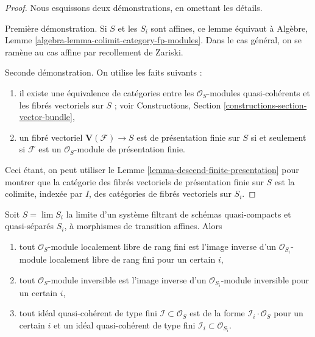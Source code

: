 \begin{proof}
Nous esquissons deux démonstrations, en omettant les détails.

\medskip\noindent
Première démonstration. Si $S$ et les $S_i$ sont affines, ce lemme
équivaut à
Algèbre, Lemme \ref{algebra-lemma-colimit-category-fp-modules}.
Dans le cas général, on se ramène au cas affine par recollement de Zariski.

\medskip\noindent
Seconde démonstration. On utilise les faits suivants :
\begin{enumerate}
\item il existe une équivalence de catégories entre les
$\mathcal{O}_S$-modules quasi-cohérents et les fibrés vectoriels sur $S$ ; voir
Constructions, Section \ref{constructions-section-vector-bundle},
\item un fibré vectoriel $\mathbf{V}(\mathcal{F}) \to S$ est
de présentation finie sur $S$ si et seulement si $\mathcal{F}$
est un $\mathcal{O}_S$-module de présentation finie.
\end{enumerate}
Ceci étant, on peut utiliser le Lemme \ref{lemma-descend-finite-presentation}
pour montrer que la catégorie des fibrés vectoriels de présentation finie
sur $S$ est la colimite, indexée par $I$,
des catégories de fibrés vectoriels sur $S_i$.
\end{proof}

\begin{lemma}
\label{lemma-descend-invertible-modules}
Soit $S = \lim S_i$ la limite d'un système filtrant de schémas
quasi-compacts et quasi-séparés $S_i$, à morphismes de transition affines. Alors
\begin{enumerate}
\item tout $\mathcal{O}_S$-module localement libre de rang fini est l'image inverse
d'un $\mathcal{O}_{S_i}$-module localement libre de rang fini pour un certain $i$,
\item tout $\mathcal{O}_S$-module inversible est l'image inverse d'un
$\mathcal{O}_{S_i}$-module inversible pour un certain $i$,
\item tout idéal quasi-cohérent de type fini $\mathcal{I} \subset \mathcal{O}_S$
est de la forme $\mathcal{I}_i \cdot \mathcal{O}_S$ pour un certain $i$ et un
idéal quasi-cohérent de type fini $\mathcal{I}_i \subset \mathcal{O}_{S_i}$.
\end{enumerate}
\end{lemma}

